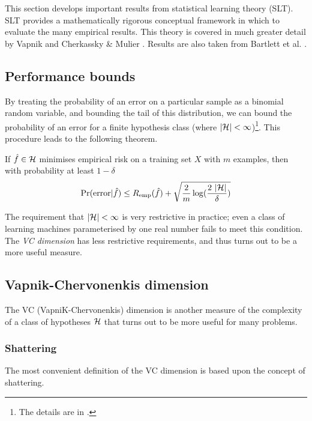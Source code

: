 This section develops important results from statistical learning
theory (SLT).  SLT provides a mathematically rigorous
conceptual framework in which to evaluate the many empirical results.
This theory is covered in much greater detail by Vapnik
\cite{Vapnik98} and Cherkassky \& Mulier \cite{Cherkassky98}.  Results
are also taken from Bartlett et al. \cite{Bartlett98a}.

\subsection{Performance bounds}

By treating the probability of an error on a particular sample as a
binomial random variable, and bounding the tail of this distribution,
we can bound the probability of an error for a finite hypothesis class
(where $|\mathcal{H}| < \infty$)\footnote{The details are in
\cite{Bartlett99b}.}.  This procedure leads to the following theorem.

\begin{theorem}
If $\hat{f} \in \mathcal{H}$ minimises empirical risk on a training set $X$
with $m$ examples, then with probability at least $1 - \delta$
%
\begin{equation}
\Pr(\mathrm{error}|\hat{f}) \leq R_{\mathrm{emp}}(\hat{f}) + \sqrt{\frac{2}{m}
\log (\frac{2\  |\mathcal{H}|}{\delta})}
\end{equation}
\end{theorem}

The requirement that $|\mathcal{H}| < \infty$ is very restrictive in
practice; even a class of learning machines parameterised by one real
number fails to meet this condition.  The \emph{VC dimension} has less
restrictive requirements, and thus turns out to be a more useful measure.


\subsection{Vapnik-Chervonenkis dimension}
\label{acr:vcdim}
\label{sec:vcdim}

The VC (VapniK-Chervonenkis) dimension is another measure of the complexity
of a class of hypotheses $\mathcal{H}$ that turns out to be more useful for
many problems.

\subsubsection{Shattering}

The most convenient definition of the VC dimension is based upon the
concept of shattering.

